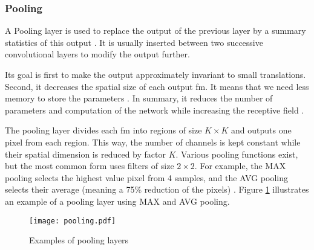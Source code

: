 \subsubsection{Pooling} \label{subs:pooling}
A Pooling layer is used to replace the output of the previous layer by a summary statistics of this output \cite{goodfellow_deep_2016}. It is usually inserted between two successive convolutional layers to modify the output further. 

Its goal is first to make the output approximately invariant to small translations. Second, it decreases the spatial size of each output \acrshort{fm}. It means that we need less memory to store the parameters \cite{goodfellow_deep_2016}. In summary, it reduces the number of parameters and  computation of the network while increasing the receptive field \cite{shawahna_fpga-based_2019, matteucci_artificial_2019}.

The pooling layer divides each \acrshort{fm} into regions of size $K \times K$ and outputs one pixel from each region. This way, the number of channels is kept constant while their spatial dimension is reduced by factor $K$. Various pooling functions exist, but the most common form uses filters of size $2 \times 2$. For example, the MAX pooling selects the highest value pixel from 4 samples, and the AVG pooling selects their average (meaning a 75\% reduction of the pixels) \cite{suda_throughput-optimized_2016}. Figure \ref{fig:pool} illustrates an example of a pooling layer using MAX and AVG pooling.
%
\begin{figure}[H]
    \centering
    \texttt{[image: pooling.pdf]}
    \caption{Examples of pooling layers}
    \label{fig:pool}
\end{figure}